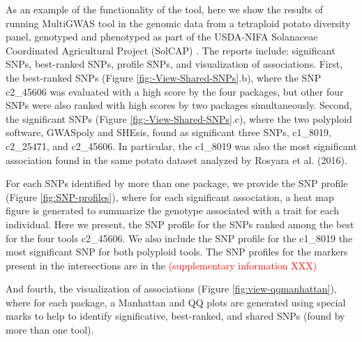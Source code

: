 \documentclass{article}
\begin{document}
As an example of the functionality of the tool, here we show the results of running MultiGWAS tool in the genomic data from a tetraploid potato diversity panel, genotyped and phenotyped as part of the USDA-NIFA Solanaceae Coordinated Agricultural Project (SolCAP) \cite{Hirsch2013}. The reports include: significant SNPs, best-ranked SNPs, profile SNPs, and visualization of associations. First, the best-ranked SNPs (Figure \ref{fig:-View-Shared-SNPs}.b), where the SNP c2\_45606 was evaluated with a high score by the four packages, but other four SNPs were also ranked with high scores by two packages simultaneously. Second, the significant SNPs (Figure \ref{fig:-View-Shared-SNPs}.c), where the two polyploid software, GWASpoly and SHEsis, found as significant three SNPs, c1\_8019, c2\_25471, and c2\_45606. In particular, the c1\_8019 was also the most significant association found in the same potato dataset analyzed by Rosyara et al. (2016). 

For each SNPs identified by more than one package, we provide the SNP profile (Figure \ref{fig:SNP-profiles}), where for each significant association, a heat map figure is generated to summarize the genotype associated with a trait for each individual. Here we present, the SNP profile for the SNPs ranked among the best for the four tools c2\_45606. We also include the SNP profile for the  c1\_8019 the most significant SNP for both polyploid tools. The SNP profiles for the markers present in the intersections are in the \textcolor{red}{(supplementary information XXX)}


And fourth, the visualization of associations (Figure \ref{fig:view-qqmanhattan}), where for each package, a Manhattan and QQ plots are generated using special marks to help to identify significative, best-ranked, and shared SNPs (found by more than one tool). 
\end{document}

